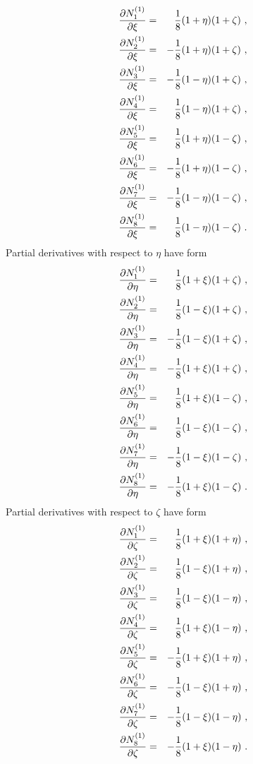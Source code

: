 \begin{eqnarray}
\label{bflinhexdx1}
\ppd{N_1^{(1)}}{\xi} &=& \del{1}{8} (1 + \eta) (1 + \zeta)\ ,
\\
\label{bflinhexdx2}
\ppd{N_2^{(1)}}{\xi} &=& - \del{1}{8} (1 + \eta) (1 + \zeta)\ ,
\\
\label{bflinhexdx3}
\ppd{N_3^{(1)}}{\xi} &=& - \del{1}{8} (1 - \eta) (1 + \zeta)\ ,
\\
\label{bflinhexdx4}
\ppd{N_4^{(1)}}{\xi} &=& \del{1}{8} (1 - \eta) (1 + \zeta)\ ,
\\
\label{bflinhexdx5}
\ppd{N_5^{(1)}}{\xi} &=& \del{1}{8} (1 + \eta) (1 - \zeta)\ ,
\\
\label{bflinhexdx6}
\ppd{N_6^{(1)}}{\xi} &=& - \del{1}{8} (1 + \eta) (1 - \zeta)\ ,
\\
\label{bflinhexdx7}
\ppd{N_7^{(1)}}{\xi} &=& - \del{1}{8} (1 - \eta) (1 - \zeta)\ ,
\\
\label{bflinhexdx8}
\ppd{N_8^{(1)}}{\xi} &=& \del{1}{8} (1 - \eta) (1 - \zeta)\ .
\end{eqnarray}
Partial derivatives with respect to $\eta$ have form
\begin{eqnarray}
\label{bflinhexdy1}
\ppd{N_1^{(1)}}{\eta} &=& \del{1}{8} (1 + \xi) (1 + \zeta)\ ,
\\
\label{bflinhexdy2}
\ppd{N_2^{(1)}}{\eta} &=& \del{1}{8} (1 - \xi) (1 + \zeta)\ ,
\\
\label{bflinhexdy3}
\ppd{N_3^{(1)}}{\eta} &=& - \del{1}{8} (1 - \xi) (1 + \zeta)\ ,
\\
\label{bflinhexdy4}
\ppd{N_4^{(1)}}{\eta} &=& - \del{1}{8} (1 + \xi) (1 + \zeta)\ ,
\\
\label{bflinhexdy5}
\ppd{N_5^{(1)}}{\eta} &=& \del{1}{8} (1 + \xi) (1 - \zeta)\ ,
\\
\label{bflinhexdy6}
\ppd{N_6^{(1)}}{\eta} &=& \del{1}{8} (1 - \xi) (1 - \zeta)\ ,
\\
\label{bflinhexdy7}
\ppd{N_7^{(1)}}{\eta} &=& - \del{1}{8} (1 - \xi) (1 - \zeta)\ ,
\\
\label{bflinhexdy8}
\ppd{N_8^{(1)}}{\eta} &=& - \del{1}{8} (1 + \xi) (1 - \zeta)\ .
\end{eqnarray}
Partial derivatives with respect to $\zeta$ have form
\begin{eqnarray}
\label{bflinhexdz1}
\ppd{N_1^{(1)}}{\zeta} &=& \del{1}{8} (1 + \xi) (1 + \eta)\ ,
\\
\label{bflinhexdz2}
\ppd{N_2^{(1)}}{\zeta} &=& \del{1}{8} (1 - \xi) (1 + \eta)\ ,
\\
\label{bflinhexdz3}
\ppd{N_3^{(1)}}{\zeta} &=& \del{1}{8} (1 - \xi) (1 - \eta)\ ,
\\
\label{bflinhexdz4}
\ppd{N_4^{(1)}}{\zeta} &=& \del{1}{8} (1 + \xi) (1 - \eta)\ ,
\\
\label{bflinhexdz5}
\ppd{N_5^{(1)}}{\zeta} &=& - \del{1}{8} (1 + \xi) (1 + \eta)\ ,
\\
\label{bflinhexdz6}
\ppd{N_6^{(1)}}{\zeta} &=& - \del{1}{8} (1 - \xi) (1 + \eta)\ ,
\\
\label{bflinhexdz7}
\ppd{N_7^{(1)}}{\zeta} &=& - \del{1}{8} (1 - \xi) (1 - \eta)\ ,
\\
\label{bflinhexdz8}
\ppd{N_8^{(1)}}{\zeta} &=& - \del{1}{8} (1 + \xi) (1 - \eta)\ .
\end{eqnarray}
